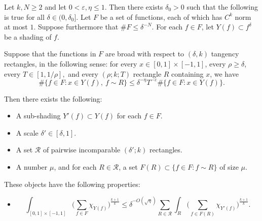 \documentclass[10pt,a4paper]{amsart}
\newcommand{\eps}{\varepsilon}
\newcommand{\itemizeEqnVSpacing}{\rule{0pt}{1pt}\vspace*{-12pt}}
\begin{document}
\begin{prop}\label{rectangleDecompProp}
Let $k,N\geq 2$ and let $0<\eps,\eta\leq 1$. Then there exists $\delta_0>0$ such that the following is true for all $\delta\in (0,\delta_0]$. Let $F$ be a set of functions, each of which has $C^k$ norm at most $1$. Suppose furthermore that $\#F \leq \delta^{-N}$. For each $f\in F$, let $Y(f)\subset f^\delta$ be a shading of $f$. 


Suppose that the functions in $F$ are broad with respect to $(\delta,k)$ tangency rectangles, in the following sense: for every $x\in[0,1]\times[-1,1]$, every $\rho\geq\delta$, every $T\in [1, 1/\rho],$ and every $(\rho; k; T)$ rectangle $R$ containing $x$, we have
%
\begin{equation}\label{inductionPropHypothesis}
\#\{f\in F\colon x\in Y(f),\ f\sim R\}\leq\delta^{-\eta}T^{-\eps}\#\{f\in F\colon x\in Y(f)\}. 
\end{equation}

Then there exists the following:
\begin{itemize}
	\item A sub-shading $Y'(f)\subset Y(f)$ for each $f\in F$.
	\item A scale $\delta'\in [\delta,1]$.
	\item A set $\mathcal{R}$ of pairwise incomparable $(\delta'; k)$ rectangles.
	\item A number $\mu$, and for each $R\in\mathcal{R}$, a set $F(R)\subset \{f\in F\colon f\sim R\}$ of size $\mu$.
\end{itemize}
These objects have the following properties:
\begin{itemize}
\item[(A)] \itemizeEqnVSpacing
\begin{equation}\label{LkBdControlledBySumOverRect}
\int_{[0,1]\times[-1,1]}\Big(\sum_{f\in F}\chi_{Y(f)}\Big)^{\frac{k+1}{k}}\leq \delta^{-O(\sqrt\eta)}\sum_{R\in\mathcal{R}} \int_{R}\Big(\sum_{f\in F(R)}\chi_{Y'(f)}\Big)^{\frac{k+1}{k}}.
\end{equation}


\end{itemize}
\end{prop}
\end{document}

